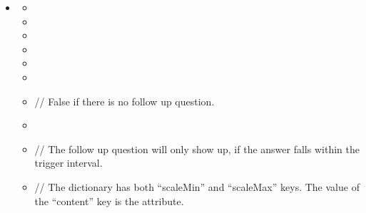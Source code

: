 \documentclass[a4paper]{scrreprt}
\begin{document}
{\begin{itemize}
                    \item {}
                        \begin{itemize}
                            \item {}
                            \item {}
                            \item {}
                            \item {}
                            \item {}
                            \item {}
                            \item {}
                                \par // False if there is no follow up question.
                            \item {}
                            \item {}
                                \par // The follow up question will only show up, if the answer falls within the trigger interval.
                            \item {}
                               \par // The dictionary has both “scaleMin” and “scaleMax” keys. The value of the “content” key is the  attribute.
                        \end{itemize}
                        

\end{itemize}}
\end{document}
